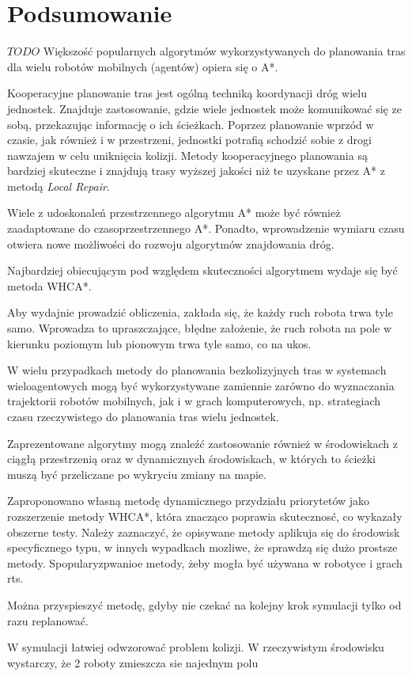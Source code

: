 \chapter{Podsumowanie}
\label{ch:podsumowanie}

$TODO$
Większość popularnych algorytmów wykorzystywanych do planowania tras dla wielu robotów mobilnych (agentów) opiera się o A*.

Kooperacyjne planowanie tras jest ogólną techniką koordynacji dróg wielu jednostek.
Znajduje zastosowanie, gdzie wiele jednostek może komunikować się ze sobą, przekazując informację o ich ścieżkach.
Poprzez planowanie wprzód w czasie, jak również i w przestrzeni, jednostki potrafią schodzić sobie z drogi nawzajem w celu uniknięcia kolizji.
Metody kooperacyjnego planowania są bardziej skuteczne i znajdują trasy wyższej jakości niż te uzyskane przez A* z metodą {\it Local Repair}.

Wiele z udoskonaleń przestrzennego algorytmu A* może być również zaadaptowane do czasoprzestrzennego A*.
Ponadto, wprowadzenie wymiaru czasu otwiera nowe możliwości do rozwoju algorytmów znajdowania dróg.

Najbardziej obiecującym pod względem skuteczności algorytmem wydaje się być metoda WHCA*.

Aby wydajnie prowadzić obliczenia, zakłada się, że każdy ruch robota trwa tyle samo. 
Wprowadza to upraszczające, błędne założenie, że ruch robota na pole w kierunku poziomym lub pionowym trwa tyle samo, co na ukos.

W wielu przypadkach metody do planowania bezkolizyjnych tras w systemach wieloagentowych mogą być wykorzystywane zamiennie zarówno do wyznaczania trajektorii robotów mobilnych, jak i w grach komputerowych, np. strategiach czasu rzeczywistego do planowania tras wielu jednostek.

Zaprezentowane algorytmy mogą znaleźć zastosowanie również w środowiskach z ciągłą przestrzenią oraz w dynamicznych środowiskach, w których to ścieżki muszą być przeliczane po wykryciu zmiany na mapie.

Zaproponowano własną metodę dynamicznego przydziału priorytetów jako rozszerzenie metody WHCA*, która znacząco poprawia skutecznosć, co wykazały obszerne testy.
Należy zaznaczyć, że opisywane metody aplikuja się do środowisk specyficznego typu, w innych wypadkach mozliwe, że sprawdzą się dużo prostsze metody.
Spopularyzpwanioe metody, żeby mogła być używana w robotyce i grach rts.

Można przyspieszyć metodę, gdyby nie czekać na kolejny krok symulacji tylko od razu replanować.

W symulacji łatwiej odwzorować problem kolizji. W rzeczywistym środowisku wystarczy, że 2 roboty zmieszcza sie najednym polu